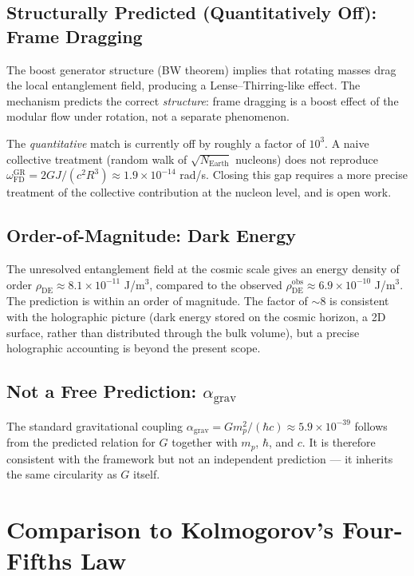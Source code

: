 \documentclass[11pt,letterpaper]{article}
\begin{document}
\subsection{Structurally Predicted (Quantitatively Off): Frame Dragging}

The boost generator structure (BW theorem) implies that rotating masses
drag the local entanglement field, producing a Lense--Thirring-like
effect. The mechanism predicts the correct \emph{structure}: frame
dragging is a boost effect of the modular flow under rotation, not a
separate phenomenon.

The \emph{quantitative} match is currently off by roughly a factor of
$10^3$. A naive collective treatment (random walk of $\sqrt{N_{\mathrm{Earth}}}$
nucleons) does not reproduce $\omega_{\mathrm{FD}}^{\mathrm{GR}} =
2GJ/(c^2 R^3) \approx 1.9 \times 10^{-14}$ rad/s. Closing this gap
requires a more precise treatment of the collective contribution at
the nucleon level, and is open work.

\subsection{Order-of-Magnitude: Dark Energy}

The unresolved entanglement field at the cosmic scale gives an energy
density of order $\rho_{\mathrm{DE}} \approx 8.1 \times 10^{-11}$ J/m$^3$,
compared to the observed $\rho_{\mathrm{DE}}^{\mathrm{obs}} \approx
6.9 \times 10^{-10}$ J/m$^3$. The prediction is within an order of
magnitude. The factor of $\sim 8$ is consistent with the holographic
picture (dark energy stored on the cosmic horizon, a 2D surface,
rather than distributed through the bulk volume), but a precise
holographic accounting is beyond the present scope.

\subsection{Not a Free Prediction: $\alpha_{\mathrm{grav}}$}

The standard gravitational coupling
$\alpha_{\mathrm{grav}} = G m_p^2/(\hbar c) \approx 5.9 \times 10^{-39}$
follows from the predicted relation for $G$ together with $m_p$, $\hbar$,
and $c$. It is therefore consistent with the framework but not an
independent prediction --- it inherits the same circularity as $G$ itself.

\section{Comparison to Kolmogorov's Four-Fifths Law}
\end{document}
